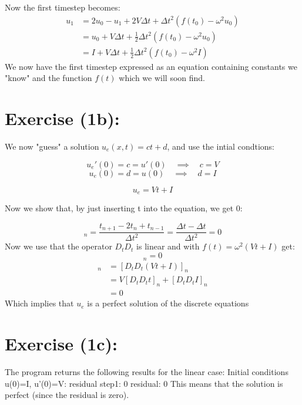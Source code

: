 \documentclass{article}
\begin{document}
Now the first timestep becomes:
%
\begin{align}
    u_{1} &= 2u_{0} - u_{1} + 2V\Delta t + \Delta t^2(f(t_0) - \omega^2 u_{0})\nonumber \\
    &= u_{0} + V\Delta t + \frac{1}{2}\Delta t^2(f(t_0) - \omega^2 u_{0})\nonumber\\
    &= I + V\Delta t + \frac{1}{2}\Delta t^2(f(t_0) - \omega^2 I)
\end{align}
%
We now have the first timestep expressed as an equation containing constants we "know" and the function $f(t)$ which we will soon find.

\newpage

\section{Exercise (1b):}
\label{sec:1b}
We now "guess" a solution $u_e(x,t) = ct + d$, and use the intial condtions:

\begin{equation*}
    u_e'(0) = c = u'(0) \quad \implies \quad c=V
\end{equation*}
\begin{equation*}
    u_e(0) = d = u(0) \quad \implies \quad d=I
\end{equation*}

\begin{equation}
    u_e = Vt + I
\end{equation}

Now we show that, by just inserting t into the equation, we get 0:

\begin{equation*}
    [D_tD_t t]_n = \frac{t_{n+1} - 2t_{n} + t_{n-1}}{\Delta t^2} = \frac{\Delta t - \Delta t}{\Delta t^2} = 0
\end{equation*}
Now we use that the operator $D_tD_t$ is linear and with $f(t) = \omega^2(Vt + I)$ get:
\begin{equation*}
    [D_tD_t u + \omega^2 u - f]_n = 0
\end{equation*}
\begin{align*}
    [D_tD_t (Vt +I) + \omega^2 (Vt + I) - f]_n
    &= [D_tD_t (Vt +I)]_n \\
    &= V[D_tD_t t]_n + [D_tD_t I]_n \\
    &= 0
\end{align*}
Which implies that $u_e$ is a perfect solution of the discrete equations

\section{Exercise (1c):}
\label{sec:1c}
%
The program returns the following results for the linear case:
\newline
\newline
Initial conditions u(0)=I, u'(0)=V:
\newline
residual step1: 0
\newline
residual: 0
\newline
\newline
This means that the solution is perfect (since the residual is zero).
%
\end{document}
